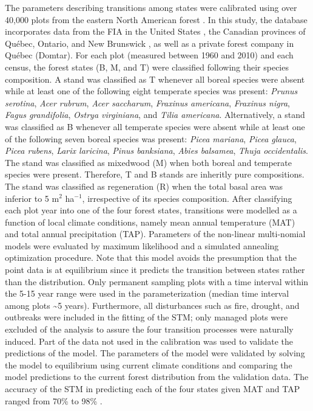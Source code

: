 The parameters describing transitions among states were calibrated using
over 40,000 plots from the eastern North American forest
\citep{Vissault2020}. In this study, the database incorporates data from
the FIA in the United States \citep{OConnell2007}, the Canadian
provinces of Québec, Ontario, and New Brunswick
\citep{Naturelles2016, OMNR2014, Porter2001}, as well as a private
forest company in Québec (Domtar). For each plot (measured between 1960
and 2010) and each census, the forest states (B, M, and T) were
classified following their species composition. A stand was classified
as T whenever all boreal species were absent while at least one of the
following eight temperate species was present: \emph{Prunus serotina},
\emph{Acer rubrum}, \emph{Acer saccharum}, \emph{Fraxinus americana},
\emph{Fraxinus nigra}, \emph{Fagus grandifolia}, \emph{Ostrya
virginiana}, and \emph{Tilia americana}. Alternatively, a stand was
classified as B whenever all temperate species were absent while at
least one of the following seven boreal species was present: \emph{Picea
mariana}, \emph{Picea glauca}, \emph{Picea rubens}, \emph{Larix
laricina}, \emph{Pinus banksiana}, \emph{Abies balsamea}, \emph{Thuja
occidentalis}. The stand was classified as mixedwood (M) when both
boreal and temperate species were present. Therefore, T and B stands are
inheritly pure compositions. The stand was classified as regeneration
(R) when the total basal area was inferior to 5 m\(^2\) ha\(^{-1}\),
irrespective of its species composition. After classifying each plot
year into one of the four forest states, transitions were modelled as a
function of local climate conditions, namely mean annual temperature
(MAT) and total annual precipitation (TAP). Parameters of the non-linear
multi-nomial models were evaluated by maximum likelihood and a simulated
annealing optimization procedure. Note that this model avoids the
presumption that the point data is at equilibrium since it predicts the
transition between states rather than the distribution. Only permanent
sampling plots with a time interval within the 5-15 year range were used
in the parameterization (median time interval among plots
\textasciitilde5 years). Furthermore, all disturbances such as fire,
drought, and outbreaks were included in the fitting of the STM; only
managed plots were excluded of the analysis to assure the four
transition processes were naturally induced. Part of the data not used
in the calibration was used to validate the predictions of the model.
The parameters of the model were validated by solving the model to
equilibrium using current climate conditions and comparing the model
predictions to the current forest distribution from the validation data.
The accuracy of the STM in predicting each of the four states given MAT
and TAP ranged from 70\% to 98\% \citep{Vissault2020}.

